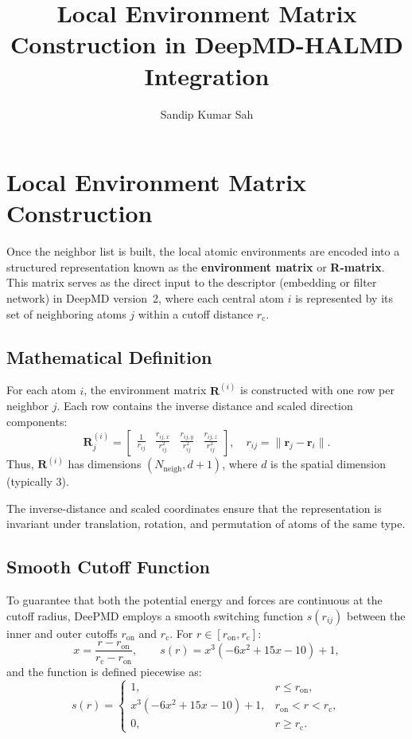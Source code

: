 \documentclass[12pt,a4paper]{article}
\title{Local Environment Matrix Construction in DeepMD-HALMD Integration}
\author{Sandip Kumar Sah}
\date{}
\begin{document}
\maketitle

\section*{Local Environment Matrix Construction}

Once the neighbor list is built, the local atomic environments are encoded into a structured representation known as the \textbf{environment matrix} or \textbf{R-matrix}.  
This matrix serves as the direct input to the descriptor (embedding or filter network) in DeepMD version~2, where each central atom $i$ is represented by its set of neighboring atoms $j$ within a cutoff distance $r_{\mathrm{c}}$.

\subsection*{Mathematical Definition}

For each atom $i$, the environment matrix $\mathbf{R}^{(i)}$ is constructed with one row per neighbor $j$.  
Each row contains the inverse distance and scaled direction components:
\[
\mathbf{R}^{(i)}_{j} = 
\begin{bmatrix}
\frac{1}{r_{ij}} & \frac{r_{ij,x}}{r_{ij}^2} & \frac{r_{ij,y}}{r_{ij}^2} & \frac{r_{ij,z}}{r_{ij}^2}
\end{bmatrix},
\quad
r_{ij} = \| \mathbf{r}_j - \mathbf{r}_i \|.
\]
Thus, $\mathbf{R}^{(i)}$ has dimensions $(N_{\mathrm{neigh}}, d+1)$, where $d$ is the spatial dimension (typically 3).

The inverse-distance and scaled coordinates ensure that the representation is invariant under translation, rotation, and permutation of atoms of the same type.

\subsection*{Smooth Cutoff Function}

To guarantee that both the potential energy and forces are continuous at the cutoff radius, DeePMD employs a smooth switching function $s(r_{ij})$ between the inner and outer cutoffs $r_{\mathrm{on}}$ and $r_{\mathrm{c}}$.  
For $r \in [r_{\mathrm{on}}, r_{\mathrm{c}}]$:
\[
x = \frac{r - r_{\mathrm{on}}}{r_{\mathrm{c}} - r_{\mathrm{on}}}, \qquad
s(r) = x^3(-6x^2 + 15x - 10) + 1,
\]
and the function is defined piecewise as:
\[
s(r) =
\begin{cases}
1, & r \le r_{\mathrm{on}},\\[5pt]
x^3(-6x^2 + 15x - 10) + 1, & r_{\mathrm{on}} < r < r_{\mathrm{c}},\\[5pt]
0, & r \ge r_{\mathrm{c}}.
\end{cases}
\]
\end{document}
